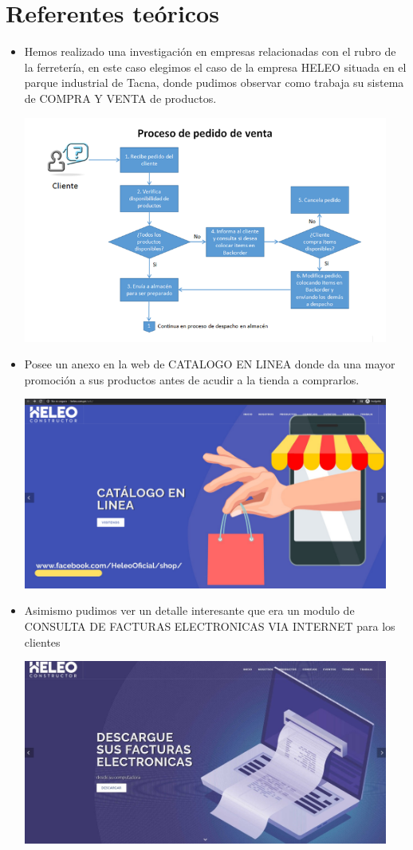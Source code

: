\documentclass[preprint,12pt]{elsarticle}
\begin{document}
	\section{Referentes teóricos}
\begin{itemize} 
    \item Hemos realizado una investigación en empresas relacionadas con el rubro de la ferretería, en este caso elegimos el caso de la empresa HELEO situada en el parque industrial de Tacna, donde pudimos observar como trabaja su sistema de COMPRA Y VENTA de productos.
	\begin{center}
	\includegraphics[width=12cm]{./imagen/1} 
	\end{center}
	\item Posee un anexo en la web de CATALOGO EN LINEA donde da una mayor promoción a sus productos antes de acudir a la tienda a comprarlos.
	\begin{center}
	\includegraphics[width=12cm]{./imagen/2} 
	\end{center}
	\item Asimismo pudimos ver un detalle interesante que era un modulo de CONSULTA DE FACTURAS ELECTRONICAS VIA INTERNET para los clientes
	\begin{center}
	\includegraphics[width=12cm]{./imagen/3} 
	\end{center}
\end{itemize}
\end{document}

